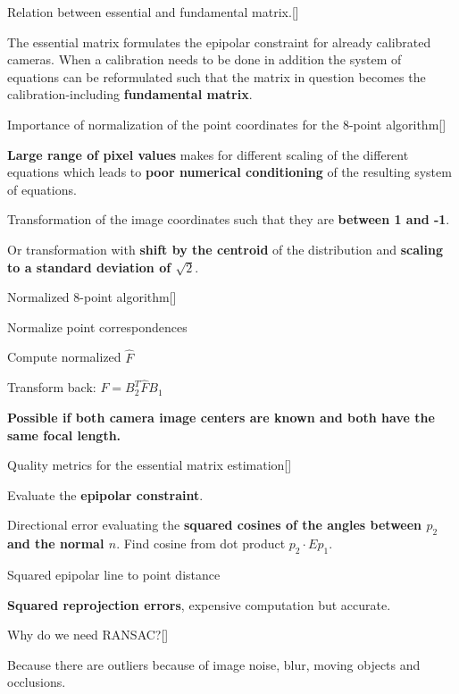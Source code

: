 \documentclass[10pt,a4paper]{scrartcl}
\begin{document}
\begin{multicols*}{2}
\begin{QandA}
{Relation between essential and fundamental matrix.}[\Comparison]
\item The essential matrix formulates the epipolar constraint for already calibrated cameras. When a calibration needs to be done in addition the system of equations can be reformulated such that the matrix in question becomes the calibration-including \textbf{fundamental matrix}.
\end{QandA}

\begin{QandA}{Importance of normalization of the point coordinates for the 8-point algorithm}[\Derivation]
\item \textbf{Large range of pixel values} makes for different scaling of the different equations which leads to \textbf{poor numerical conditioning} of the resulting system of equations.
\item Transformation of the image coordinates such that they are \textbf{between 1 and -1}.
\item Or transformation with \textbf{shift by the centroid} of the distribution and \textbf{scaling to a standard deviation of $\sqrt{2}$}.
\end{QandA}

\begin{QandA}
{Normalized 8-point algorithm}[\Definition]
\item Normalize point correspondences
\item Compute normalized $\hat{F}$ 
\item Transform back: $F = B_2^T\hat{F} B_1$
\item \textbf{Possible if both camera image centers are known and both have the same focal length.}
\end{QandA}

\begin{QandA}
{Quality metrics for the essential matrix estimation}[\Application]
\item Evaluate the \textbf{epipolar constraint}.
\item Directional error evaluating the \textbf{squared cosines of the angles between $p_2$ and the normal $n$}. Find cosine from dot product $p_2\cdot Ep_1$.
\item Squared epipolar line to point distance
\item \textbf{Squared reprojection errors}, expensive computation but accurate.
\end{QandA}

\begin{QandA}
{Why do we need RANSAC?}[\Application]
\item Because there are outliers because of image noise, blur, moving objects and occlusions.
\end{QandA}


\end{multicols*}
\end{document}
